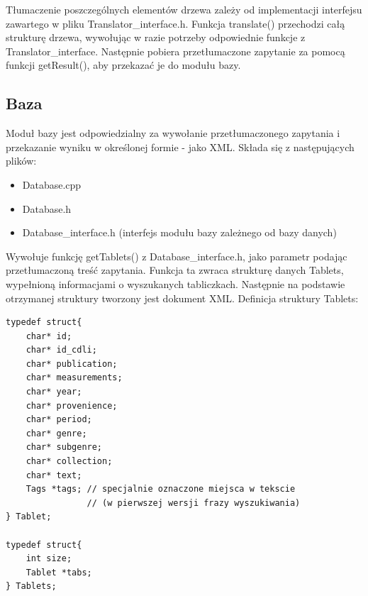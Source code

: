 Tłumaczenie poszczególnych elementów drzewa zależy od implementacji interfejsu zawartego w pliku Translator\_interface.h. 
Funkcja translate() przechodzi całą strukturę drzewa, wywołując w razie potrzeby odpowiednie funkcje z Translator\_interface.
Następnie pobiera przetłumaczone zapytanie za pomocą funkcji getResult(), aby przekazać je do modułu bazy.

\subsection{Baza}
Moduł bazy jest odpowiedzialny za wywołanie przetłumaczonego zapytania i przekazanie wyniku w określonej formie - jako XML.
Składa się z następujących plików:
\begin {itemize}
 \item Database.cpp
 \item Database.h
 \item Database\_interface.h (interfejs modułu bazy zależnego od bazy danych)
\end {itemize}

Wywołuje funkcję getTablets() z Database\_interface.h, jako parametr podając przetłumaczoną treść zapytania. 
Funkcja ta zwraca strukturę danych Tablets, wypełnioną informacjami o wyszukanych tabliczkach.
Następnie na podstawie otrzymanej struktury tworzony jest dokument XML.
\newline
Definicja struktury Tablets:
\begin{verbatim}
typedef struct{    
    char* id;
    char* id_cdli;
    char* publication;
    char* measurements;
    char* year;
    char* provenience;
    char* period;
    char* genre;
    char* subgenre;
    char* collection;
    char* text;
    Tags *tags; // specjalnie oznaczone miejsca w tekscie
                // (w pierwszej wersji frazy wyszukiwania)
} Tablet;

typedef struct{
    int size;
    Tablet *tabs;
} Tablets;
\end{verbatim}



